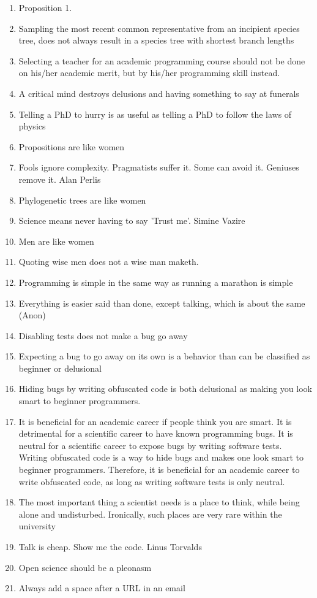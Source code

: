 \documentclass{dissertation}
\begin{document}
\begin{enumerate}

\item Proposition 1.
\item Sampling the most recent common representative from an incipient
  species tree, does not always result in a species tree with shortest
  branch lengths
\item Selecting a teacher for an academic programming course should not be done on his/her academic merit, but by his/her programming skill instead.
\item A critical mind destroys delusions and having something to say at funerals
\item Telling a PhD to hurry is as useful as telling a PhD to follow the laws of physics
\item Propositions are like women
\item Fools ignore complexity. Pragmatists suffer it. Some can avoid it. Geniuses remove it. Alan Perlis
\item Phylogenetic trees are like women
\item Science means never having to say 'Trust me'. Simine Vazire 
\item Men are like women
\item Quoting wise men does not a wise man maketh.
\item Programming is simple in the same way as running a marathon is simple
\item Everything is easier said than done, except talking, which is about the same (Anon)
\item Disabling tests does not make a bug go away
\item Expecting a bug to go away on its own is a behavior than can be classified as beginner or delusional
\item Hiding bugs by writing obfuscated code is both delusional as making you look smart to beginner programmers. 
\item It is beneficial for an academic career if people think you are smart.
      It is detrimental for a scientific career to have known programming bugs.
      It is neutral for a scientific career to expose bugs by writing software tests.
      Writing obfuscated code is a way to hide bugs and makes one look smart to beginner programmers.
      Therefore, it is beneficial for an academic career to write obfuscated code,
      as long as writing software tests is only neutral.
\item The most important thing a scientist needs is a place to think, while
      being alone and undisturbed. Ironically, such places are very rare
      within the university
\item Talk is cheap. Show me the code. Linus Torvalds
\item Open science should be a pleonasm
\item Always add a space after a URL in an email

\end{enumerate}
\end{document}
